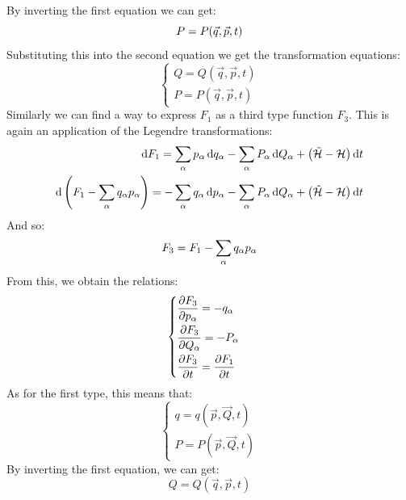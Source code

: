 By inverting the first equation we can get:
\begin{equation}
    P = P(\vec{q},\vec{p},t)\\
\end{equation}
Substituting this into the second equation we get the transformation equations:
\begin{equation}
    \begin{cases}
        Q = Q(\vec{q},\vec{p},t)\\
        P = P(\vec{q},\vec{p},t)
    \end{cases}
\end{equation}
Similarly we can find a way to express $F_1$ as a third type function $F_3$. This is again an application of the Legendre transformations:
\begin{equation}
    \begin{split}
        \dd{F_1} = \displaystyle\sum_{\alpha}p_{\alpha}\dd{q_{\alpha}} - \displaystyle\sum_{\alpha}P_{\alpha}\dd{Q_{\alpha}} + \left(\tilde{\mathcal{H}}- \mathcal{H}\right)\dd{t}\\
    \dd{\left(F_1 - \displaystyle\sum_{\alpha}q_{\alpha}p_{\alpha}\right)} = -\displaystyle\sum_{\alpha}q_{\alpha}\dd{p_{\alpha}} - \displaystyle\sum_{\alpha}P_{\alpha}\dd{Q_{\alpha}} + \left(\tilde{\mathcal{H}}- \mathcal{H}\right)\dd{t}
    \end{split}
\end{equation}
And so:
\begin{equation}
    F_3 = F_1 - \displaystyle\sum_{\alpha}q_{\alpha}p_{\alpha}
\end{equation}
From this, we obtain the relations:
\begin{equation}
    \begin{cases}
        \pdv{F_3}{p_{\alpha}} = -q_{\alpha}\\[8pt]
        \pdv{F_3}{Q_{\alpha}} = -P_{\alpha}\\[8pt]
        \pdv{F_3}{t} = \pdv{F_1}{t}
    \end{cases}
\end{equation}
As for the first type, this means that:
\begin{equation}
    \begin{cases}
        q = q(\vec{p},\vec{Q},t)\\
        P = P(\vec{p},\vec{Q},t)
    \end{cases}
\end{equation}
By inverting the first equation, we can get:
\begin{equation}
    Q = Q(\vec{q},\vec{p},t)
\end{equation}
